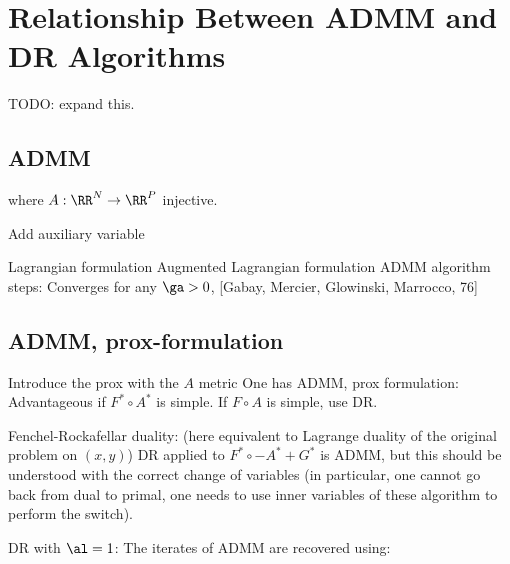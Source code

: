 \section{Relationship Between ADMM and DR Algorithms}

TODO: expand this. 

\subsection{ADMM}

where $A : \RR^N \rightarrow \RR^P$ injective.

Add auxiliary variable

Lagrangian formulation
Augmented Lagrangian formulation
ADMM algorithm steps:
Converges for any $\ga > 0$, [Gabay, Mercier, Glowinski, Marrocco, 76]


\subsection{ADMM, prox-formulation}

Introduce the prox with the $A$ metric
One has
ADMM, prox formulation:
Advantageous if $F^* \circ A^*$ is simple. If $F \circ A$ is simple, use DR. 




Fenchel-Rockafellar duality: (here equivalent to Lagrange duality of the original problem on $(x,y)$)
DR applied to $F^* \circ -A^* + G^*$ is ADMM, but this should be understood with the correct change of variables (in particular, one cannot go back from dual to primal, one needs to use inner variables of these algorithm to perform the switch).

DR with $\al=1$:
The iterates of ADMM are recovered using:


